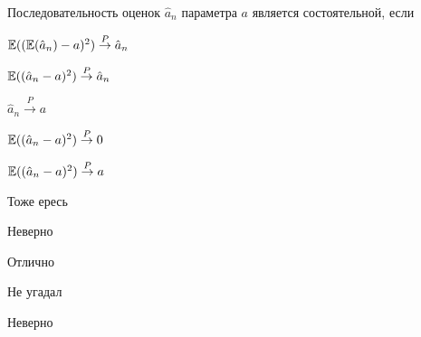 
\begin{question}
Последовательность оценок \(\hat a_n\) параметра \(a\) является
состоятельной, если
\begin{answerlist}
  \item \(\operatorname{\mathbb{E}}((\operatorname{\mathbb{E}}(\hat a_n) - a)^2) \stackrel{P}{\to} \hat a_n\)
  \item \(\operatorname{\mathbb{E}}((\hat a_n - a)^2) \stackrel{P}{\to} \hat a_n\)
  \item \(\hat a_n \stackrel{P}{\to} a\)
  \item \(\operatorname{\mathbb{E}}((\hat a_n - a)^2) \stackrel{P}{\to} 0\)
  \item \(\operatorname{\mathbb{E}}((\hat a_n - a)^2) \stackrel{P}{\to} a\)
\end{answerlist}
\end{question}

\begin{solution}
\begin{answerlist}
  \item Тоже ересь
  \item Неверно
  \item Отлично
  \item Не угадал
  \item Неверно
\end{answerlist}
\end{solution}

